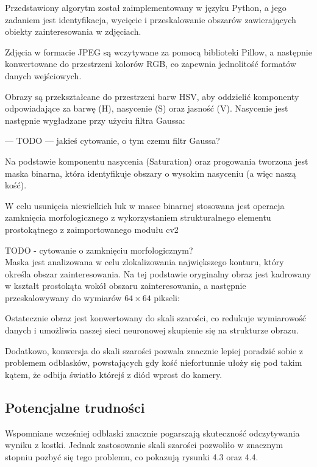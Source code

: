 Przedstawiony algorytm został zaimplementowany w języku Python, a jego zadaniem jest identyfikacja, wycięcie i przeskalowanie obszarów zawierających obiekty zainteresowania w zdjęciach.

Zdjęcia w formacie JPEG są wczytywane za pomocą biblioteki Pillow, a następnie konwertowane do przestrzeni kolorów RGB, co zapewnia jednolitość formatów danych wejściowych.

Obrazy są przekształcane do przestrzeni barw HSV, aby oddzielić komponenty odpowiadające za barwę (H), nasycenie (S) oraz jasność (V).
Nasycenie jest następnie wygładzane przy użyciu filtra Gaussa:

--- TODO ---
jakieś cytowanie, o tym czemu filtr Gaussa?

Na podstawie komponentu nasycenia (Saturation) oraz progowania tworzona jest maska binarna, która identyfikuje obszary o wysokim nasyceniu (a więc naszą kość).

W celu usunięcia niewielkich luk w masce binarnej stosowana jest operacja zamknięcia morfologicznego z wykorzystaniem strukturalnego elementu prostokątnego z zaimportowanego modułu cv2

TODO - cytowanie o zamknięciu morfologicznym?  \\

Maska jest analizowana w celu zlokalizowania największego konturu, który określa obszar zainteresowania.
Na tej podstawie oryginalny obraz jest kadrowany w kształt prostokąta wokół obszaru zainteresowania,
a następnie przeskalowywany do wymiarów $64 \times 64$ pikseli:

Ostatecznie obraz jest konwertowany do skali szarości, co redukuje wymiarowość danych
i umożliwia naszej sieci neuronowej skupienie się na strukturze obrazu.

Dodatkowo, konwersja do skali szarości pozwala znacznie lepiej poradzić sobie z problemem odblasków,
powstających gdy kość niefortunnie ułoży się pod takim kątem, że odbija światło którejś z diód wprost do kamery.

\subsection{Potencjalne trudności}

Wspomniane wcześniej odblaski znacznie pogarszają skuteczność odczytywania wyniku z kostki.
Jednak zastosowanie skali szarości pozwoliło w znacznym stopniu pozbyć się tego problemu, co pokazują rysunki 4.3 oraz 4.4.

